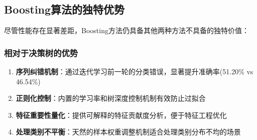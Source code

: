 \documentclass[UTF8]{report}
\theoremstyle{MyLineTheoremStyle} %
\theoremstyle{MyBlockTheoremStyle} %
\theoremstyle{MySubsubsectionStyle} %
\begin{document}
\subsection{Boosting算法的独特优势}
尽管性能存在显著差距，Boosting方法仍具备其他两种方法不具备的独特价值：
\subsubsection{相对于决策树的优势}
\begin{enumerate}
    \item \textbf{序列纠错机制}：通过迭代学习前一轮的分类错误，显著提升准确率(51.20\% vs 46.54\%)
    \item \textbf{正则化控制}：内置的学习率和树深度控制机制有效防止过拟合
    \item \textbf{特征重要性量化}：提供可解释的特征贡献度分析，便于特征工程优化
    \item \textbf{处理类别不平衡}：天然的样本权重调整机制适合处理类别分布不均的场景
\end{enumerate}
\end{document}
